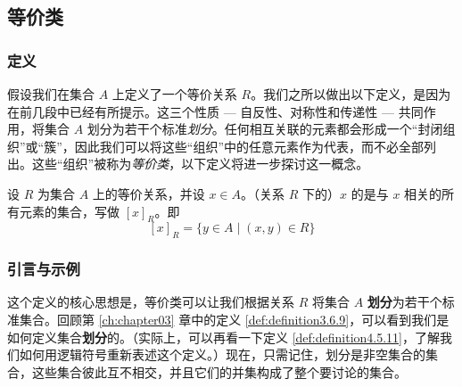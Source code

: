 
\subsection{等价类}

\subsubsection*{定义}

假设我们在集合 $A$ 上定义了一个等价关系 $R$。我们之所以做出以下定义，是因为在前几段中已经有所提示。这三个性质 --- 自反性、对称性和传递性 --- 共同作用，将集合 $A$ 划分为若干个标准\emph{划分}。任何相互关联的元素都会形成一个``封闭组织''或``簇''，因此我们可以将这些``组织''中的任意元素作为代表，而不必全部列出。这些``组织''被称为\emph{等价类}，以下定义将进一步探讨这一概念。

\begin{definition}
    设 $R$ 为集合 $A$ 上的等价关系，并设 $x \in A$。（关系 $R$ 下的）$x$ 的是与 $x$ 相关的所有元素的集合，写做 $[x]_R$。即
    \[[x]_R = \{y \in A \mid (x,y) \in R\}\]
\end{definition}

\subsubsection*{引言与示例}

这个定义的核心思想是，等价类可以让我们根据关系 $R$ 将集合 $A$ \textbf{划分}为若干个标准集合。回顾第 \ref{ch:chapter03} 章中的定义 \ref{def:definition3.6.9}，可以看到我们是如何定义集合\textbf{划分}的。（实际上，可以再看一下定义 \ref{def:definition4.5.11}，了解我们如何用逻辑符号重新表述这个定义。）现在，只需记住，划分是非空集合的集合，这些集合彼此互不相交，并且它们的并集构成了整个要讨论的集合。\\

